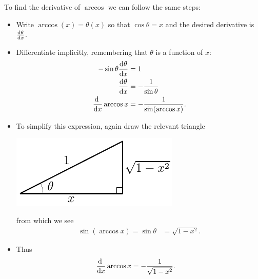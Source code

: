 \begin{eg}
To find the derivative of $\arccos$ we can follow the same steps:
\begin{itemize}
 \item Write $\arccos(x) =\theta(x)$ so that $\cos\theta = x$ and the desired
derivative is $\diff{\theta}{x}$.
\item Differentiate implicitly, remembering that $\theta$ is a function of $x$:
  \begin{align*}
  -\sin\theta \diff{\theta}{x} &= 1 \\
  \diff{\theta}{x} &= -\frac{1}{\sin\theta} \\
  \diff{}{x}\arccos x &= -\frac{1}{\sin(\arccos x)}.
\end{align*}
\item To simplify this expression, again draw the relevant triangle
\begin{efig}
\begin{center}
  \includegraphics{triangleAcos}
\end{center}
\end{efig}
from which we see
\begin{align*}
\sin(\arccos x) = \sin\theta &= \sqrt{1-x^2}.
\end{align*}
\item Thus
\begin{align*}
  \diff{}{x}\arccos x &= -\frac{1}{\sqrt{1-x^2}}.
\end{align*}
\end{itemize}
\end{eg}

